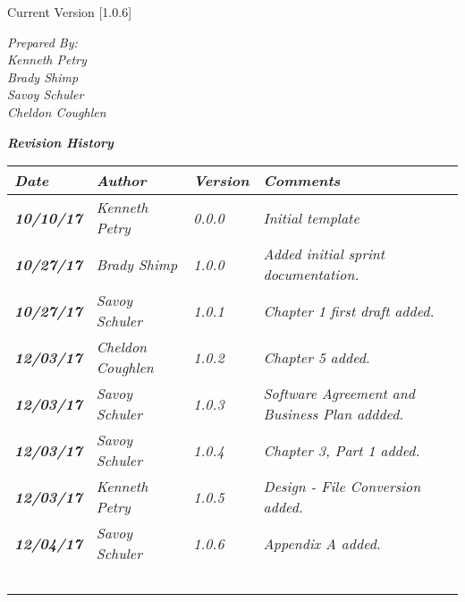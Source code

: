 


Current Version [1.0.6]
\vspace*{5mm}

{\color{SDColor5}
\noindent
\textit{Prepared By:}\\
\textit{Kenneth Petry}\\
\textit{Brady Shimp}\\
\textit{Savoy Schuler}\\
\textit{Cheldon Coughlen}
}

\vfill
\noindent
{\color{SDColor3} \textit{\textbf{Revision History}}}\\
\begin{tabular}{|>{\raggedright}p{1.5cm}|>{\raggedright}p{3cm}|>{\raggedright}p{1.5cm}|>{\raggedright}p{9cm}|}
  \hline
  \textit{\textbf{Date}} &  \textit{\textbf{Author}} & \textit{\textbf{Version}} & \textit{\textbf{Comments}}\tabularnewline
  \hline
  \textit{\textbf{10/10/17}} & \textit{Kenneth Petry} & \textit{0.0.0} & \textit{Initial template}\tabularnewline\hline
  \textit{\textbf{10/27/17}} & \textit{Brady Shimp} & \textit{1.0.0} & \textit{Added initial sprint documentation.}\tabularnewline\hline
  \textit{\textbf{10/27/17}} & \textit{Savoy Schuler} & \textit{1.0.1} & \textit{Chapter 1 first draft added.}\tabularnewline\hline
  \textit{\textbf{12/03/17}} & \textit{Cheldon Coughlen} & \textit{1.0.2} & \textit{Chapter 5 added.}\tabularnewline\hline
  \textit{\textbf{12/03/17}} & \textit{Savoy Schuler} & \textit{1.0.3} & \textit{Software Agreement and Business Plan addded.}\tabularnewline\hline
  \textit{\textbf{12/03/17}} & \textit{Savoy Schuler} & \textit{1.0.4} & \textit{Chapter 3, Part 1 added.}\tabularnewline\hline
  \textit{\textbf{12/03/17}} & \textit{Kenneth Petry} & \textit{1.0.5} & \textit{Design - File Conversion added.}\tabularnewline\hline  \textit{\textbf{12/04/17}} & \textit{Savoy Schuler} & \textit{1.0.6} & \textit{Appendix A added.}\tabularnewline\hline
  &  &  & \tabularnewline
  \hline
  &  &  & \tabularnewline
  \hline
  &  &  & \tabularnewline
  \hline
  &  &  & \tabularnewline
  \hline
  &  &  & \tabularnewline
  \hline
\end{tabular}
\vfill

